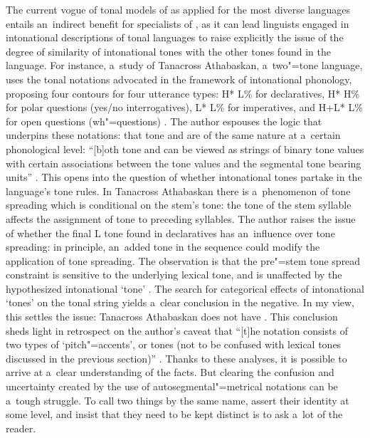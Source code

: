 The current vogue of tonal models of  as applied for the most diverse languages entails an~indirect benefit for specialists of , as it can lead linguists engaged in intonational descriptions of tonal languages to raise explicitly the issue of the degree of similarity of intonational tones with the other tones found in the language. For instance, a~study of Tanacross Athabaskan, a~two"=tone language, uses the tonal notations advocated in the framework of intonational phonology, proposing four  contours for four utterance types: H* \mbox{L\%} for declaratives, H* \mbox{H\%} for polar questions (yes/no interrogatives), L* L\% for imperatives, and H+L* L\% for open questions (wh"=questions) \citep[263]{holton2005}. The author espouses the logic that underpins these notations: that tone and  are of the same nature at a~certain phonological level: ``[b]oth tone and  can be viewed as strings of binary tone values with certain associations between the tone values and the segmental tone bearing units'' \citep[267]{holton2005}. This opens into the {question} of whether intonational tones partake in the language's tone rules. In Tanacross Athabaskan there is a~phenomenon of tone spreading which is conditional on the stem's tone: the tone of the stem syllable affects the assignment of tone to preceding syllables. The author raises the issue of whether the final L tone found in declaratives has an~influence over tone spreading: in principle, an~added tone in the sequence could modify the application of tone spreading. The observation is that the pre"=stem tone spread constraint is sensitive to the underlying lexical tone, and is unaffected by the hypothesized intonational `tone' \citep[270]{holton2005}. The search for categorical effects of intonational `tones' on the tonal string yields a~clear conclusion in the negative. In my view, this settles the issue: Tanacross Athabaskan does not have . This conclusion sheds light in retrospect on the author's caveat that ``[t]he notation consists of two types of `pitch"=accents', or tones (not to be confused with lexical tones discussed in the previous section)'' \citep[263]{holton2005}. Thanks to these analyses, it is possible to arrive at a~clear understanding of the facts. But clearing the confusion and uncertainty created by the use of autosegmental"=metrical notations can be a~tough struggle. To call two things by the same name, assert their identity at some level, and insist that they need to be kept distinct is to ask a~lot of the reader. 

